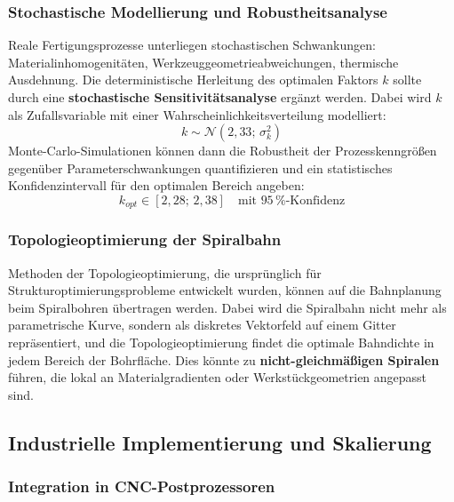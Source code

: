 ﻿\documentclass[12pt,a4paper]{article}
\begin{document}
\subsubsection{Stochastische Modellierung und Robustheitsanalyse}

Reale Fertigungsprozesse unterliegen stochastischen Schwankungen: Materialinhomogenitäten, Werkzeuggeometrieabweichungen, thermische Ausdehnung. Die deterministische Herleitung des optimalen Faktors $k$ sollte durch eine \textbf{stochastische Sensitivitätsanalyse} ergänzt werden. Dabei wird $k$ als Zufallsvariable mit einer Wahrscheinlichkeitsverteilung modelliert:
\begin{equation}
    k \sim \mathcal{N}(2{,}33;\, \sigma_k^2)
\end{equation}
Monte-Carlo-Simulationen können dann die Robustheit der Prozesskenngrößen gegenüber Parameterschwankungen quantifizieren und ein statistisches Konfidenzintervall für den optimalen Bereich angeben:
\begin{equation}
    k_{opt} \in [2{,}28;\, 2{,}38] \quad \text{mit } 95\,\% \text{-Konfidenz}
\end{equation}

\subsubsection{Topologieoptimierung der Spiralbahn}

Methoden der Topologieoptimierung, die ursprünglich für Strukturoptimierungsprobleme entwickelt wurden, können auf die Bahnplanung beim Spiralbohren übertragen werden. Dabei wird die Spiralbahn nicht mehr als parametrische Kurve, sondern als diskretes Vektorfeld auf einem Gitter repräsentiert, und die Topologieoptimierung findet die optimale Bahndichte in jedem Bereich der Bohrfläche. Dies könnte zu \textbf{nicht-gleichmäßigen Spiralen} führen, die lokal an Materialgradienten oder Werkstückgeometrien angepasst sind.

\subsection{Industrielle Implementierung und Skalierung}

\subsubsection{Integration in CNC-Postprozessoren}
\end{document}
